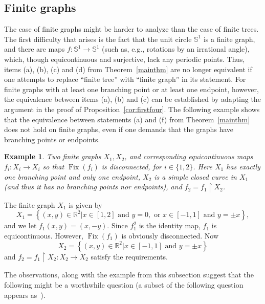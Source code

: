 \documentclass[12pt]{amsart}
\theoremstyle{definition}
\newtheorem{example}[theorem]{Example}
\numberwithin{equation}{section}
\DeclareMathOperator{\fix}{Fix}
\begin{document}
\subsection{Finite graphs}

The case of finite graphs might be harder to analyze than the case of finite trees. The first difficulty that arises is the fact that the unit circle $\mathbb S^1$ is a finite graph, and there are maps 
$f \colon \mathbb S^1\longrightarrow\mathbb S^1$ (such as, e.g., rotations by an irrational angle), which, though equicontinuous and surjective, lack any periodic 
points. Thus, items (a), (b), (c) and (d) from Theorem~\ref{mainthm} are no longer equivalent if one attempts to replace ``finite tree'' with ``finite graph'' in its statement. For finite graphs with at least one branching point or at 
least one endpoint, however, the equivalence between items (a), (b) and (c) can be established by adapting the argument in the proof of Proposition~\ref{cor:firstfour}. The following example shows that the equivalence between statements (a) and (f) from Theorem~\ref{mainthm} does not hold on finite graphs, even if one demands that the graphs have branching points or endpoints.

\begin{example}\label{finite-graph}
{\em Two finite graphs $X_1,X_2$, and corresponding equicontinuous maps $f_i \colon X_i \longrightarrow X_i$ so that $\fix(f_i)$ is disconnected, for $i\in\{1,2\}$. Here $X_1$ has exactly one branching point and only one endpoint, $X_2$ is a simple closed curve in $X_1$ \emph{(}and thus it has no branching points nor endpoints\emph{)}, and $f_2=f_1\upharpoonright X_2$.} 

The finite graph $X_1$ is given by
\begin{equation*}
X_1=\left\{(x,y)\in\mathbb R^2\big|x \in [1,2]\text{ and }y=0,\text{ or } x\in[-1,1]\text{ and }y=\pm x\right\},
\end{equation*}
and we let $f_1(x,y)=(x,-y)$. Since $f_1^2$ is the identity map, $f_1$ is equicontinuous. However, $\fix(f_1)$ is obviously disconnected. Now 
\begin{equation*}
X_2 = \left\{(x,y)\in\mathbb R^2\big| x\in[-1,1]\text{ and }y=\pm x\right\}
\end{equation*}
and  $f_2=f_1\upharpoonright X_2 \colon X_2 \longrightarrow X_2$ satisfy the requirements.
\end{example}

The observations, along with the example from this subsection suggest that the following might be a worthwhile question (a subset of the following question appears as~\cite[Question~3.10]{ivon-salvador}).
\end{document}
